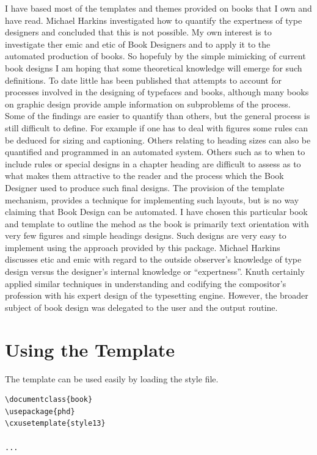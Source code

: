 I have based most of the templates and themes provided on books that I own and have read. Michael Harkins \citep{harkins2013} investigated how to quantify the expertness of type designers and concluded that this is not possible. My own interest is to investigate ther emic and etic of Book Designers and to apply it to the automated production of books. So hopefuly by the simple mimicking of current book designs I am hoping that some theoretical knowledge will emerge for such definitions. To date little has been published that attempts to account for processes involved in the designing of typefaces and books, although many books on graphic design provide ample information on subproblems of the process. Some of the findings are easier to quantify than others, but the
general process is still difficult to define. For example if one has to deal with figures some rules can be deduced for sizing and captioning. Others relating to heading sizes can also be quantified and programmed in an automated system. Others such as to when to include rules or special designs in a chapter heading are difficult to assess as to what makes them attractive to the reader and the process which the Book Designer used to produce such final designs. The provision of the template mechanism, provides a technique for implementing such layouts, but is no way claiming that Book Design can be automated. I have chosen this particular book and template to outline the mehod as the book is primarily text orientation with very few figures and simple headings designs. Such designs are very easy to implement using the approach provided by this package.  Michael Harkins discusses etic and
emic with regard to the outside observer's knowledge of type design versus the designer’s internal knowledge or
“expertness”.  Knuth certainly applied similar techniques in understanding and codifying the compositor’s profession with his expert design of the \tex typesetting engine. However, the broader subject of book design was delegated to the user and the output routine. 

\section{Using the Template}

The template can be used easily by loading the style file.

\begin{verbatim}
\documentclass{book}
\usepackage{phd}
\cxusetemplate{style13}

...

\end{verbatim}

